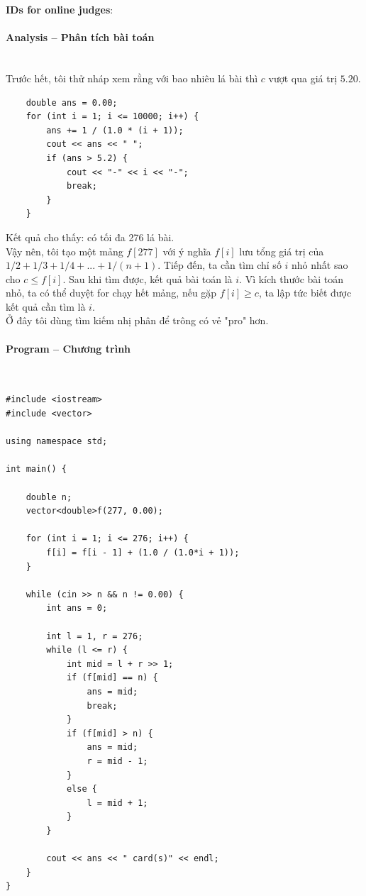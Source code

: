 \documentclass{article}
\begin{document}
\textbf{IDs for online judges}: 


\paragraph{Analysis -- Phân tích bài toán} \mbox{} \\

Trước hết, tôi thử nháp xem rằng với bao nhiêu lá bài thì $c$ vượt qua giá trị $5.20$.

\begin{lstlisting}
	double ans = 0.00;
	for (int i = 1; i <= 10000; i++) {
		ans += 1 / (1.0 * (i + 1));
		cout << ans << " ";
		if (ans > 5.2) {
			cout << "-" << i << "-";
			break;
		}
	}
\end{lstlisting}

Kết quả cho thấy: có tối đa 276 lá bài. \\

Vậy nên, tôi tạo một mảng $f[277]$ với ý nghĩa $f[i]$ lưu tổng giá trị của $1/2 + 1/3 + 1/4 + . . . + 1/(n + 1)$. Tiếp đến, ta cần tìm chỉ số $i$ nhỏ nhất sao cho $c \leq f[i]$. Sau khi tìm được, kết quả bài toán là $i$. Vì kích thước bài toán nhỏ, ta có thể duyệt for chạy hết mảng, nếu gặp $f[i] \geq c$, ta lập tức biết được kết quả cần tìm là $i$.\\

Ở đây tôi dùng tìm kiếm nhị phân để trông có vẻ "pro" hơn.

\paragraph{Program -- Chương trình} \mbox{} \\


\begin{lstlisting}
#include <iostream>
#include <vector>

using namespace std;

int main() {

	double n;
	vector<double>f(277, 0.00);

	for (int i = 1; i <= 276; i++) {
		f[i] = f[i - 1] + (1.0 / (1.0*i + 1));
	}

	while (cin >> n && n != 0.00) {
		int ans = 0;

		int l = 1, r = 276;
		while (l <= r) {
			int mid = l + r >> 1;
			if (f[mid] == n) {
				ans = mid;
				break;
			}
			if (f[mid] > n) {
				ans = mid;
				r = mid - 1;
			}
			else {
				l = mid + 1;
			}
		}

		cout << ans << " card(s)" << endl;
	}
}
\end{lstlisting}
\end{document}
